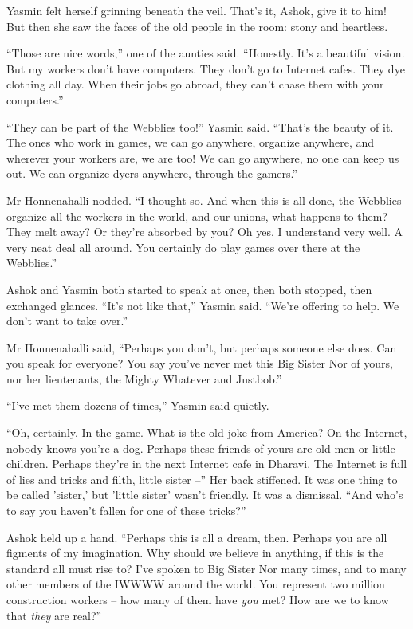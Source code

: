 Yasmin felt herself grinning beneath the veil. That's it, Ashok,
give it to him! But then she saw the faces of the old people in the
room: stony and heartless.

``Those are nice words,'' one of the aunties said. ``Honestly. It's a
beautiful vision. But my workers don't have computers. They don't
go to Internet cafes. They dye clothing all day. When their jobs go
abroad, they can't chase them with your computers.''

``They can be part of the Webblies too!'' Yasmin said. ``That's the
beauty of it. The ones who work in games, we can go anywhere,
organize anywhere, and wherever your workers are, we are too! We
can go anywhere, no one can keep us out. We can organize dyers
anywhere, through the gamers.''

Mr Honnenahalli nodded. ``I thought so. And when this is all done,
the Webblies organize all the workers in the world, and our unions,
what happens to them? They melt away? Or they're absorbed by you?
Oh yes, I understand very well. A very neat deal all around. You
certainly do play games over there at the Webblies.''

Ashok and Yasmin both started to speak at once, then both stopped,
then exchanged glances. ``It's not like that,'' Yasmin said. ``We're
offering to help. We don't want to take over.''

Mr Honnenahalli said, ``Perhaps you don't, but perhaps someone else
does. Can you speak for everyone? You say you've never met this Big
Sister Nor of yours, nor her lieutenants, the Mighty Whatever and
Justbob.''

``I've met them dozens of times,'' Yasmin said quietly.

``Oh, certainly. In the game. What is the old joke from America? On
the Internet, nobody knows you're a dog. Perhaps these friends of
yours are old men or little children. Perhaps they're in the next
Internet cafe in Dharavi. The Internet is full of lies and tricks
and filth, little sister --'' Her back stiffened. It was one thing
to be called 'sister,' but 'little sister' wasn't friendly. It was
a dismissal. ``And who's to say you haven't fallen for one of these
tricks?''

Ashok held up a hand. ``Perhaps this is all a dream, then. Perhaps
you are all figments of my imagination. Why should we believe in
anything, if this is the standard all must rise to? I've spoken to
Big Sister Nor many times, and to many other members of the IWWWW
around the world. You represent two million construction workers --
how many of them have \emph{you} met? How are we to know that
\emph{they} are real?''

